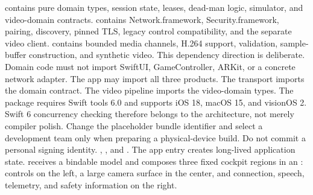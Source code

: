 \markdownRendererUlItem {} contains pure domain types, session state, leases, dead-man logic, simulator, and video-domain contracts.\markdownRendererUlItemEnd 
\markdownRendererUlItem {} contains Network.framework, Security.framework, pairing, discovery, pinned TLS, legacy control compatibility, and the separate video client.\markdownRendererUlItemEnd 
\markdownRendererUlItem {} contains bounded media channels, H.264 support, validation, sample-buffer construction, and synthetic video.\markdownRendererUlItemEnd 
\markdownRendererUlEnd \markdownRendererInterblockSeparator
{}This dependency direction is deliberate. Domain code must not import SwiftUI, GameController, ARKit, or a concrete network adapter. The app may import all three products. The transport imports the domain contract. The video pipeline imports the video-domain types.\markdownRendererParagraphSeparator
{}The package requires Swift tools 6.0 and supports iOS 18, macOS 15, and visionOS 2. Swift 6 concurrency checking therefore belongs to the architecture, not merely compiler polish.\markdownRendererInterblockSeparator
{}\markdownRendererSectionBegin
{}\markdownRendererInterblockSeparator
{}\markdownRendererInterblockSeparator
{}Change the placeholder bundle identifier and select a development team only when preparing a physical-device build. Do not commit a personal signing identity.\markdownRendererInterblockSeparator
{}
\markdownRendererSectionEnd 
\markdownRendererSectionEnd \markdownRendererSectionBegin
{}\markdownRendererInterblockSeparator
{}\markdownRendererBlockQuoteBegin
{} , , and .\markdownRendererBlockQuoteEnd \markdownRendererInterblockSeparator
{}The app entry creates long-lived application state.  receives a bindable model and composes three fixed cockpit regions in an : controls on the left, a large camera surface in the center, and connection, speech, telemetry, and safety information on the right.\markdownRendererParagraphSeparator
